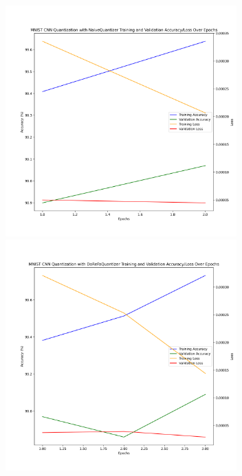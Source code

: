 \documentclass{article}
\begin{document}
\begin{figure}
	\centerline{\includegraphics[width=3.5in]{../proj2/figures/mnist_cnn_NaiveQuantizer_linear.png}\includegraphics[width=3.5in]{../proj2/figures/mnist_cnn_DoReFaQuantizer_linear.png}}

\end{figure}
\end{document}
